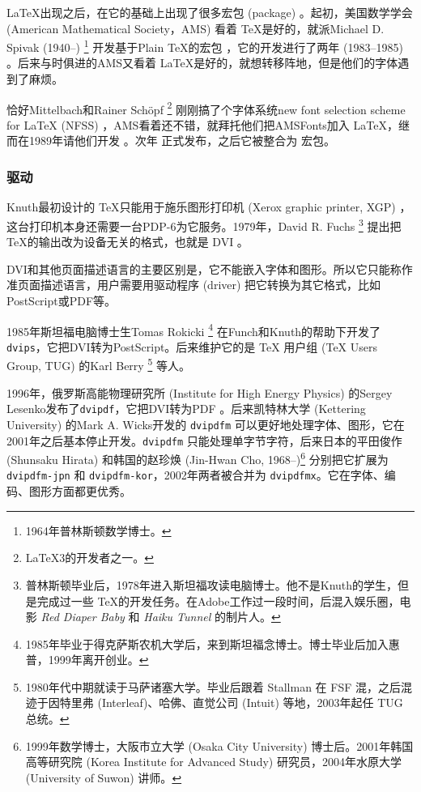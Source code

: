 \LaTeX 出现之后，在它的基础上出现了很多宏包 (package) 。起初，美国数学学会 (American Mathematical Society，AMS)\indexAMS{} 看着 \TeX 是好的，就派Michael D. Spivak (1940--)\indexSpivak{} \footnote{1964年普林斯顿数学博士。} 开发基于Plain \TeX 的宏包 \AmSTeX{}，它的开发进行了两年 (1983--1985) 。后来与时俱进的AMS又看着 \LaTeX 是好的，就想转移阵地，但是他们的字体遇到了麻烦。

恰好Mittelbach和Rainer Schöpf\indexSchopf{} \footnote{\LaTeX 3的开发者之一。} 刚刚搞了个字体系统new font selection scheme for \LaTeX{} (NFSS) ，AMS看着还不错，就拜托他们把AMSFonts加入 \LaTeX，继而在1989年请他们开发 \AmSLaTeX{}。次年 \AmSLaTeX 正式发布，之后它被整合为 \AmS 宏包。

\subsubsection{驱动}

Knuth最初设计的 \TeX 只能用于施乐图形打印机 (Xerox graphic printer, XGP) ，这台打印机本身还需要一台PDP-6为它服务。1979年，David R. Fuchs\indexFuchs{} \footnote{普林斯顿毕业后，1978年进入斯坦福攻读电脑博士。他不是Knuth的学生，但是完成过一些 \TeX 的开发任务。在Adobe工作过一段时间，后混入娱乐圈，电影 \emph{Red Diaper Baby} 和 \emph{Haiku Tunnel} 的制片人。} 提出把 \TeX 的输出改为设备无关的格式，也就是 DVI 。

DVI和其他页面描述语言的主要区别是，它不能嵌入字体和图形。所以它只能称作准页面描述语言，用户需要用驱动程序 (driver) 把它转换为其它格式，比如PostScript或PDF等。

1985年斯坦福电脑博士生Tomas Rokicki\indexRokicki{} \footnote{1985年毕业于得克萨斯农机大学后，来到斯坦福念博士。博士毕业后加入惠普，1999年离开创业。} 在Funch和Knuth的帮助下开发了\texttt{dvips}，它把DVI转为PostScript。后来维护它的是 TeX 用户组 (TeX Users Group, TUG)\indexTUG{} 的Karl Berry\indexBerry{} \footnote{1980年代中期就读于马萨诸塞大学。毕业后跟着 Stallman 在 FSF 混，之后混迹于因特里弗 (Interleaf)、哈佛、直觉公司 (Intuit) 等地，2003年起任 TUG 总统。} 等人。

1996年，俄罗斯高能物理研究所 (Institute for High Energy Physics) 的Sergey Lesenko\indexLesenko 发布了\texttt{dvipdf}，它把DVI转为PDF 。后来凯特林大学 (Kettering University) 的Mark A. Wicks\indexWicks 开发的 \texttt{dvipdfm} 可以更好地处理字体、图形，它在2001年之后基本停止开发。\texttt{dvipdfm} 只能处理单字节字符，后来日本的平田俊作 (Shunsaku Hirata)\indexHirata{} 和韩国的赵珍焕 (Jin-Hwan Cho, 1968--)\indexCho{}\footnote{1999年数学博士，大阪市立大学 (Osaka City University) 博士后。2001年韩国高等研究院 (Korea Institute for Advanced Study) 研究员，2004年水原大学 (University of Suwon) 讲师。} 分别把它扩展为 \texttt{dvipdfm-jpn} 和 \texttt{dvipdfm-kor}，2002年两者被合并为 \texttt{dvipdfmx}。它在字体、编码、图形方面都更优秀。

